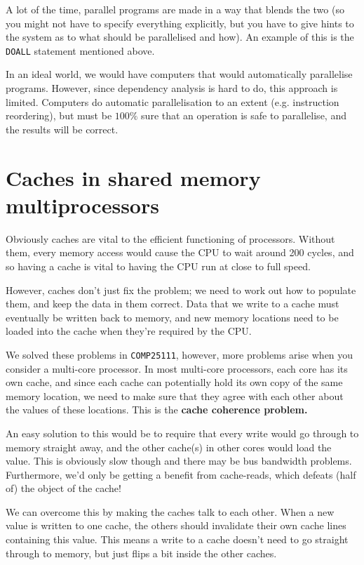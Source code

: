 A lot of the time, parallel programs are made in a way that blends the two (so
you might not have to specify everything explicitly, but you have to give hints
to the system as to what should be parallelised and how). An example of this is
the \texttt{DOALL} statement mentioned above.

In an ideal world, we would have computers that would automatically parallelise
programs. However, since dependency analysis is hard to do, this approach is
limited. Computers do automatic parallelisation to an extent (e.g. instruction
reordering), but must be $100\%$ sure that an operation is safe to parallelise,
and the results will be correct.


\section{Caches in shared memory multiprocessors}

Obviously caches are vital to the efficient functioning of processors. Without
them, every memory access would cause the CPU to wait around 200 cycles, and so
having a cache is vital to having the CPU run at close to full speed.

However, caches don't just fix the problem; we need to work out how to populate
them, and keep the data in them correct. Data that we write to a cache must
eventually be written back to memory, and new memory locations need to be loaded
into the cache when they're required by the CPU.

We solved these problems in \texttt{COMP25111}, however, more problems arise
when you consider a multi-core processor. In most multi-core processors, each
core has its own cache, and since each cache can potentially hold its own copy
of the same memory location, we need to make sure that they agree with each
other about the values of these locations. This is the \textbf{cache coherence
problem.}

An easy solution to this would be to require that every write would go through
to memory straight away, and the other cache(s) in other cores would load the
value. This is obviously slow though and there may be bus bandwidth problems.
Furthermore, we'd only be getting a benefit from cache-reads, which defeats
(half of) the object of the cache!

We can overcome this by making the caches talk to each other. When a new value
is written to one cache, the others should invalidate their own cache lines
containing this value. This means a write to a cache doesn't need to go straight
through to memory, but just flips a bit inside the other caches.

